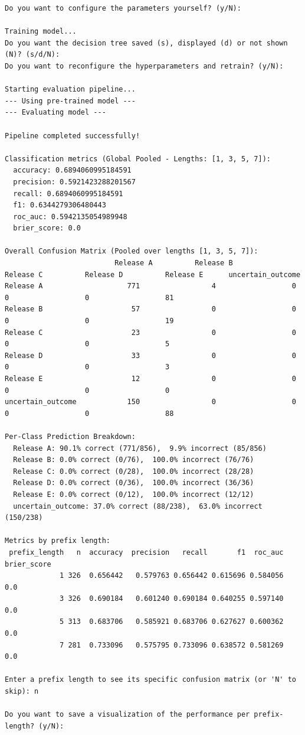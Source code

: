 \documentclass[12pt,a4paper]{article}
\begin{document}
\begin{verbatim}
Do you want to configure the parameters yourself? (y/N): 

Training model...
Do you want the decision tree saved (s), displayed (d) or not shown (N)? (s/d/N): 
Do you want to reconfigure the hyperparameters and retrain? (y/N): 

Starting evaluation pipeline...
--- Using pre-trained model ---
--- Evaluating model ---

Pipeline completed successfully!

Classification metrics (Global Pooled - Lengths: [1, 3, 5, 7]):
  accuracy: 0.6894060995184591
  precision: 0.5921423288201567
  recall: 0.6894060995184591
  f1: 0.6344279306480443
  roc_auc: 0.5942135054989948
  brier_score: 0.0

Overall Confusion Matrix (Pooled over lengths [1, 3, 5, 7]):
                          Release A          Release B          Release C          Release D          Release E      uncertain_outcome 
Release A                    771                 4                  0                  0                  0                  81        
Release B                     57                 0                  0                  0                  0                  19        
Release C                     23                 0                  0                  0                  0                  5         
Release D                     33                 0                  0                  0                  0                  3         
Release E                     12                 0                  0                  0                  0                  0         
uncertain_outcome            150                 0                  0                  0                  0                  88        

Per-Class Prediction Breakdown:
  Release A: 90.1% correct (771/856),  9.9% incorrect (85/856)
  Release B: 0.0% correct (0/76),  100.0% incorrect (76/76)
  Release C: 0.0% correct (0/28),  100.0% incorrect (28/28)
  Release D: 0.0% correct (0/36),  100.0% incorrect (36/36)
  Release E: 0.0% correct (0/12),  100.0% incorrect (12/12)
  uncertain_outcome: 37.0% correct (88/238),  63.0% incorrect (150/238)

Metrics by prefix length:
 prefix_length   n  accuracy  precision   recall       f1  roc_auc  brier_score
             1 326  0.656442   0.579763 0.656442 0.615696 0.584056          0.0
             3 326  0.690184   0.601240 0.690184 0.640255 0.597140          0.0
             5 313  0.683706   0.585921 0.683706 0.627627 0.600362          0.0
             7 281  0.733096   0.575795 0.733096 0.638572 0.581269          0.0

Enter a prefix length to see its specific confusion matrix (or 'N' to skip): n

Do you want to save a visualization of the performance per prefix-length? (y/N):
\end{verbatim}
\end{document}
